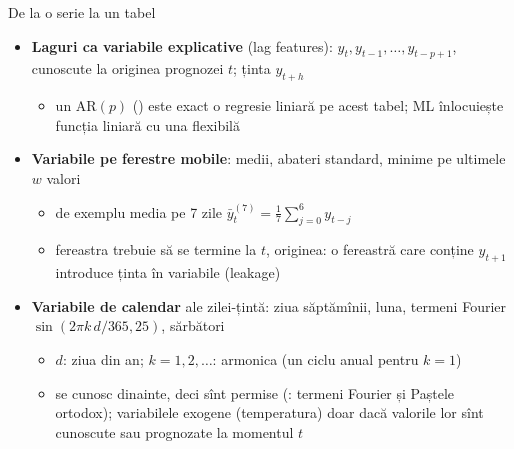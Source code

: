 \begin{frame}{De la o serie la un tabel}
\itemsize{\small}
\begin{itemize}
    \item \textbf{Laguri ca variabile explicative} (lag features): $y_{t}, y_{t-1}, \dots, y_{t-p+1}$, cunoscute la originea prognozei $t$; ținta $y_{t+h}$
    \begin{itemize}
        \item un AR$(p)$ () este exact o regresie liniară pe acest tabel; ML înlocuiește funcția liniară cu una flexibilă
    \end{itemize}
    \item \textbf{Variabile pe ferestre mobile}: medii, abateri standard, minime pe ultimele $w$ valori
    \begin{itemize}
        \item de exemplu media pe 7 zile $\bar y_t^{(7)} = \frac{1}{7}\sum_{j=0}^{6} y_{t-j}$
        \item fereastra trebuie să se termine la $t$, originea: o fereastră care conține $y_{t+1}$ introduce ținta în variabile (leakage)
    \end{itemize}
    \item \textbf{Variabile de calendar} ale zilei-țintă: ziua săptămînii, luna, termeni Fourier $\sin(2\pi k\,d/365{,}25)$, sărbători
    \begin{itemize}
        \item $d$: ziua din an; $k = 1, 2, \dots$: armonica (un ciclu anual pentru $k = 1$)
        \item se cunosc dinainte, deci sînt permise (: termeni Fourier și Paștele ortodox); variabilele exogene (temperatura) doar dacă valorile lor sînt cunoscute sau prognozate la momentul $t$
    \end{itemize}
\end{itemize}
\end{frame}


